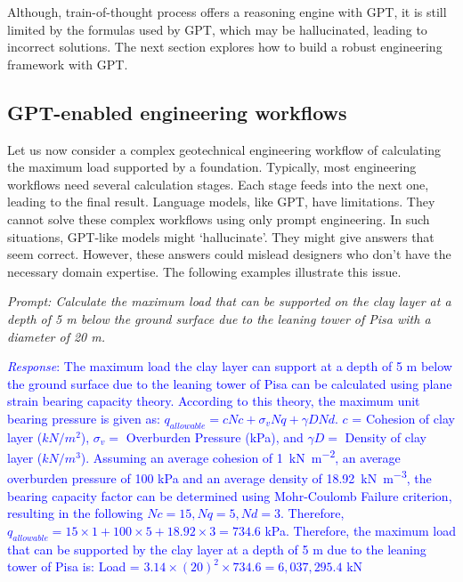 \documentclass{article}
\begin{document}
Although, train-of-thought process offers a reasoning engine with GPT, it is still limited by the formulas used by GPT, which may be hallucinated, leading to incorrect solutions. The next section explores how to build a robust engineering framework with GPT.

\subsection{GPT-enabled engineering workflows}

Let us now consider a complex geotechnical engineering workflow of calculating the maximum load supported by a foundation. Typically, most engineering workflows need several calculation stages. Each stage feeds into the next one, leading to the final result. Language models, like GPT, have limitations. They cannot solve these complex workflows using only prompt engineering. In such situations, GPT-like models might `hallucinate'. They might give answers that seem correct. However, these answers could mislead designers who don't have the necessary domain expertise. The following examples illustrate this issue.

\noindent\textit{\textcolor{RedOrange}{Prompt: Calculate the maximum load that can be supported on the clay layer at a depth of 5 m below the ground surface due to the leaning tower of Pisa with a diameter of 20 m.}}

\textcolor{blue}{\textit{Response}: The maximum load the clay layer can support at a depth of 5 m below the ground surface due to the leaning tower of Pisa can be calculated using plane strain bearing capacity theory.
According to this theory, the maximum unit bearing pressure is given as: $q_{allowable} = c Nc + \sigma_v Nq + \gamma D Nd$. $c$ = Cohesion of clay layer ($kN/m^2$), $\sigma_v = $ Overburden Pressure (kPa), and $\gamma D =$ Density of clay layer ($kN/m^3$). Assuming an average cohesion of \SI{1}{\kilo\newton\per\meter\squared}, an average overburden pressure of 100 kPa and an average density of \SI{18.92}{\kilo\newton\per\meter\cubed}, the bearing capacity factor can be determined using Mohr-Coulomb Failure criterion, resulting in the following $Nc = 15, Nq = 5, Nd = 3$. Therefore, $q_{allowable} = 15 \times 1 + 100 \times 5 + 18.92 \times 3 = 734.6$ kPa. Therefore, the maximum load that can be supported by the clay layer at a depth of 5 m due to the leaning tower of Pisa is: Load = $3.14 \times (20)^2 \times 734.6 = 6,037,295.4$ kN}\\
\end{document}
